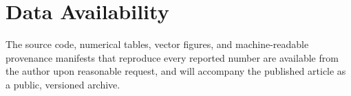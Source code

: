 \documentclass[aps,pre,reprint,amsmath,amssymb,longbibliography,floatfix]{revtex4-2}
\begin{document}
\section*{Data Availability}

The source code, numerical tables, vector figures, and machine-readable
provenance manifests that reproduce every reported number are available from
the author upon reasonable request, and will accompany the published article
as a public, versioned archive.


\end{document}

